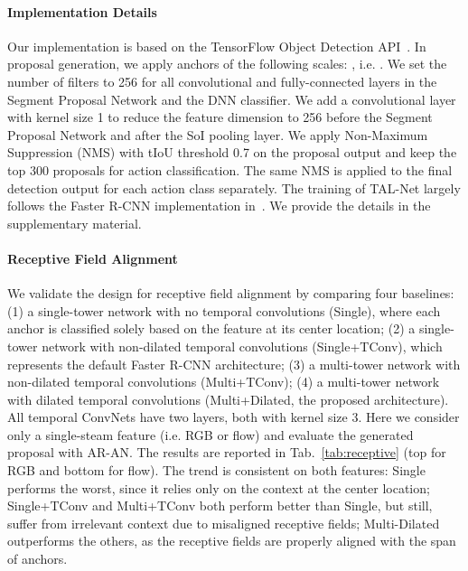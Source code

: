 \documentclass[10pt,twocolumn,letterpaper]{article}
\begin{document}
\vspace{-3mm}

\paragraph{Implementation Details} Our implementation is based on the
TensorFlow Object Detection API~\cite{huang:cvpr2017}. In proposal generation,
we apply anchors of the following scales: ,
i.e. . We set the number of filters to 256 for all convolutional and
fully-connected layers in the Segment Proposal Network and the DNN classifier.
We add a convolutional layer with kernel size 1 to reduce the feature dimension
to 256 before the Segment Proposal Network and after the SoI pooling layer. We
apply Non-Maximum Suppression (NMS) with tIoU threshold 0.7 on the proposal
output and keep the top 300 proposals for action classification. The same NMS
is applied to the final detection output for each action class separately. The
training of TAL-Net largely follows the Faster R-CNN implementation
in~\cite{huang:cvpr2017}. We provide the details in the supplementary material.




\vspace{-3mm}

\paragraph{Receptive Field Alignment} We validate the design for receptive
field alignment by comparing four baselines: (1) a single-tower network with no
temporal convolutions (Single), where each anchor is classified solely based on
the feature at its center location; (2) a single-tower network with non-dilated
temporal convolutions (Single+TConv), which represents the default Faster R-CNN
architecture; (3) a multi-tower network with non-dilated temporal convolutions
(Multi+TConv); (4) a multi-tower network with dilated temporal convolutions
(Multi+Dilated, the proposed architecture). All temporal ConvNets have two
layers, both with kernel size 3. Here we consider only a single-steam feature
(i.e. RGB or flow) and evaluate the generated proposal with AR-AN. The results
are reported in Tab.~\ref{tab:receptive} (top for RGB and bottom for flow). The
trend is consistent on both features: Single performs the worst, since it
relies only on the context at the center location; Single+TConv and Multi+TConv
both perform better than Single, but still, suffer from irrelevant context due
to misaligned receptive fields; Multi-Dilated outperforms the others, as the
receptive fields are properly aligned with the span of anchors.
\end{document}
